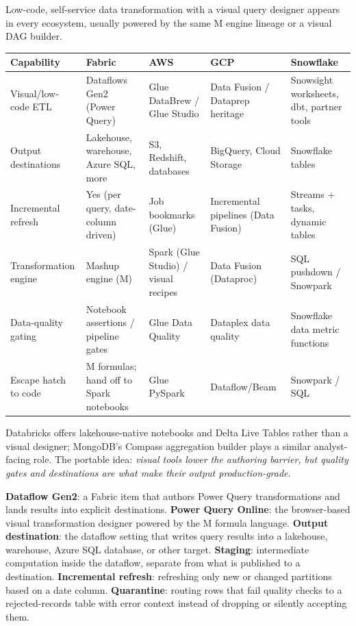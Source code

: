 \begin{crosscloud}
Low-code, self-service data transformation with a visual query designer appears in every ecosystem, usually powered by the same M engine lineage or a visual DAG builder.

\vspace{2mm}
{\footnotesize
\begin{tabular}{@{}p{2.8cm}p{3.2cm}p{3.2cm}p{3.2cm}p{3.2cm}@{}}
\toprule
\textbf{Capability} & \textbf{Fabric} & \textbf{AWS} & \textbf{GCP} & \textbf{Snowflake} \\
\midrule
Visual/low-code ETL & Dataflows Gen2 (Power Query) & Glue DataBrew / Glue Studio & Data Fusion / Dataprep heritage & Snowsight worksheets, dbt, partner tools \\
Output destinations & Lakehouse, warehouse, Azure SQL, more & S3, Redshift, databases & BigQuery, Cloud Storage & Snowflake tables \\
Incremental refresh & Yes (per query, date-column driven) & Job bookmarks (Glue) & Incremental pipelines (Data Fusion) & Streams + tasks, dynamic tables \\
Transformation engine & Mashup engine (M) & Spark (Glue Studio) / visual recipes & Data Fusion (Dataproc) & SQL pushdown / Snowpark \\
Data-quality gating & Notebook assertions / pipeline gates & Glue Data Quality & Dataplex data quality & Snowflake data metric functions \\
Escape hatch to code & M formulas; hand off to Spark notebooks & Glue PySpark & Dataflow/Beam & Snowpark / SQL \\
\bottomrule
\end{tabular}}

\vspace{1mm}
Databricks offers lakehouse-native notebooks and Delta Live Tables rather than a visual designer; MongoDB's Compass aggregation builder plays a similar analyst-facing role. The portable idea: \emph{visual tools lower the authoring barrier, but quality gates and destinations are what make their output production-grade}.
\end{crosscloud}

\begin{keyterms}
\textbf{Dataflow Gen2}: a Fabric item that authors Power Query transformations and lands results into explicit destinations. \quad
\textbf{Power Query Online}: the browser-based visual transformation designer powered by the M formula language. \quad
\textbf{Output destination}: the dataflow setting that writes query results into a lakehouse, warehouse, Azure SQL database, or other target. \quad
\textbf{Staging}: intermediate computation inside the dataflow, separate from what is published to a destination. \quad
\textbf{Incremental refresh}: refreshing only new or changed partitions based on a date column. \quad
\textbf{Quarantine}: routing rows that fail quality checks to a rejected-records table with error context instead of dropping or silently accepting them.
\end{keyterms}

